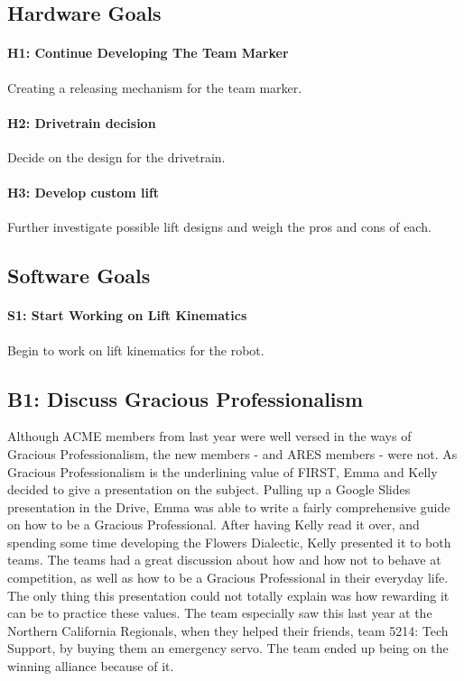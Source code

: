 \documentclass{article}
\begin{document}
\subsection{Hardware Goals}
\paragraph{H1: Continue Developing The Team Marker}
 Creating a releasing mechanism for the team marker. 
\paragraph{H2: Drivetrain decision}
 Decide on the design for the drivetrain.
\paragraph{H3: Develop custom lift}
 Further investigate possible lift designs and weigh the pros and cons of each. 
\subsection{Software Goals}
\paragraph{S1: Start Working on Lift Kinematics}
 Begin to work on lift kinematics for the robot.
\newpage
\subsection{B1: Discuss Gracious Professionalism}

Although ACME members from last year were well versed in the ways of Gracious Professionalism, the new members - and ARES members - were not. As Gracious Professionalism is the underlining value of FIRST, Emma and Kelly decided to give a presentation on the subject. Pulling up a Google Slides presentation in the Drive, Emma was able to write a fairly comprehensive guide on how to be a Gracious Professional. After having Kelly read it over, and spending some time developing the Flowers Dialectic, Kelly presented it to both teams. The teams had a great discussion about how and how not to behave at competition, as well as how to be a Gracious Professional in their everyday life. The only thing this presentation could not totally explain was how rewarding it can be to practice these values. The team especially saw this last year at the Northern California Regionals, when they helped their friends, team 5214: Tech Support, by buying them an emergency servo. The team ended up being on the winning alliance because of it.  
\end{document}
